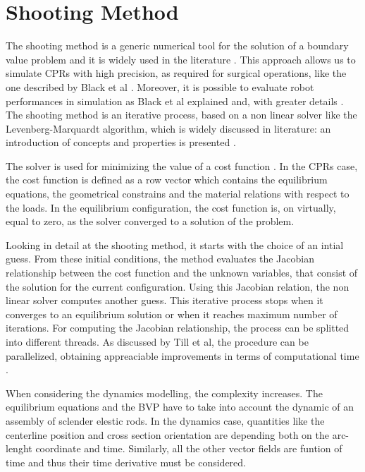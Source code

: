 \documentclass{thesisreport}
\begin{document}
 \section{Shooting Method}
 The shooting method is a generic numerical tool for the solution of a boundary value problem and it is widely used in the literature \cite{black_modeling_2017}\cite{black_parallel_2018}\cite{florian_geometrically_2020}. This approach allows us to simulate CPRs with high precision, as required for surgical operations, like the one described by Black et al \cite{black_modeling_2017}. Moreover, it is possible to evaluate robot performances in simulation as Black et al explained \cite{black_parallel_2018} and, with greater details \cite{black_modeling_2017}. The shooting method is an iterative process, based on a non linear solver like the Levenberg-Marquardt algorithm, which is widely discussed in literature: an introduction of concepts and properties is presented \cite{lourakis_brief_nodate}.
  
 The solver is used for minimizing the value of a cost function \cite{florian_geometrically_2020}. In the CPRs case, the cost function is defined as a row vector which contains the equilibrium equations, the geometrical constrains and the material relations with respect to the loads. In the equilibrium configuration, the cost function is, on virtually, equal to zero, as the solver converged to a solution of the problem.
 
 Looking in detail at the shooting method, it starts with the choice of an intial guess. From these initial conditions, the method evaluates the Jacobian relationship between the cost function and the unknown variables, that consist of the solution for the current configuration. Using this Jacobian relation, the non linear solver computes another guess. This iterative process stops when it converges to an equilibrium solution or when it reaches maximum number of iterations. For computing the Jacobian relationship, the process can be splitted into different threads. As discussed by Till et al, the procedure can be parallelized, obtaining appreaciable improvements in terms of computational time \cite{till_efficient_2015}.  
 
 When considering the dynamics modelling, the complexity increases. The equilibrium equations and the BVP have to take into account the dynamic of an assembly of sclender elestic rods. In the dynamics case, quantities like the centerline position and cross section orientation are depending both on the arc-lenght coordinate and time. Similarly, all the other vector fields are funtion of time and thus their time derivative must be considered. 
 
\end{document}
